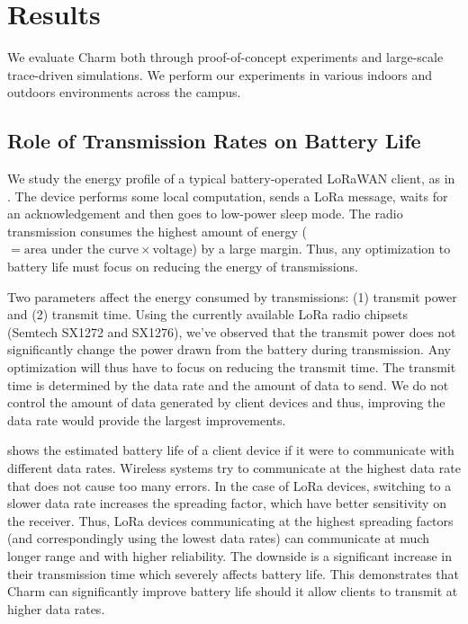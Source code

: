 


\section{Results}
\label{sec:eval}


We evaluate Charm both through proof-of-concept experiments and large-scale
trace-driven simulations. We perform our experiments in various indoors and
outdoors environments across the campus.

\subsection{Role of Transmission Rates on Battery Life}
\label{sec:energy-savings}

We study the energy profile of a typical battery-operated LoRaWAN client, as
in . The device performs some local computation, sends a
LoRa message, waits for an acknowledgement and then goes to low-power sleep
mode. The radio transmission consumes the highest amount of energy ($=
\text{area under the curve} \times \text{voltage}$) by a large margin. Thus,
any optimization to battery life must focus on reducing the energy of
transmissions.

Two parameters affect the energy consumed by transmissions: (1) transmit power
and (2) transmit time. Using the currently available LoRa radio chipsets
(Semtech SX1272 and SX1276), we've observed that the transmit power does not
significantly change the power drawn from the battery during transmission. Any
optimization will thus have to focus on reducing the transmit time. The
transmit time is determined by the data rate and the amount of data to send.
We do not control the amount of data generated by client devices and thus,
improving the data rate would provide the largest improvements.

 shows the estimated battery life of a client
device if it were to communicate with different data rates. Wireless systems
try to communicate at the highest data rate that does not cause too many
errors. In the case of LoRa devices, switching to a slower data rate increases
the spreading factor,  which have better sensitivity on the receiver. Thus,
LoRa devices communicating at the highest spreading factors (and
correspondingly using the lowest data rates) can communicate at much longer
range and with higher reliability. The downside is a significant increase in
their transmission time which severely affects battery life. This demonstrates
that Charm can significantly improve battery life should it allow clients to
transmit at higher data rates.

